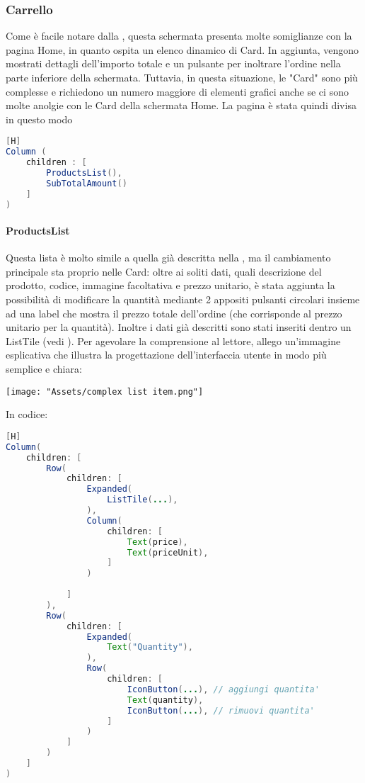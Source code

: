 \noindent
\subsubsection{Carrello}
Come è facile notare dalla , questa schermata presenta molte somiglianze con la pagina Home, in quanto ospita un elenco dinamico di Card. In aggiunta, vengono mostrati dettagli dell'importo totale e un pulsante per inoltrare l'ordine nella parte inferiore della schermata. Tuttavia, in questa situazione, le "Card" sono più complesse e richiedono un numero maggiore di elementi grafici anche se ci sono molte anolgie con le Card della schermata Home. La pagina è stata quindi divisa in questo modo
\begin{lstlisting}[language=Java, firstnumber=1][H]
Column (
	children : [
		ProductsList(),
		SubTotalAmount()
	]
)
\end{lstlisting}

\noindent
\paragraph{ProductsList}
Questa lista è molto simile a quella già descritta nella , ma il cambiamento principale sta proprio nelle Card: oltre ai soliti dati, quali descrizione del prodotto, codice, immagine facoltativa e prezzo unitario, è stata aggiunta la possibilità di modificare la quantità mediante 2 appositi pulsanti circolari insieme ad una label che mostra il prezzo totale dell'ordine (che corrisponde al prezzo unitario per la quantità). Inoltre i dati già descritti sono stati inseriti dentro un ListTile (vedi ). Per agevolare la comprensione al lettore, allego un'immagine esplicativa che illustra la progettazione dell'interfaccia utente in modo più semplice e chiara:
\begin{flushleft}
	\begin{minipage}[t]{1\linewidth}
		\texttt{[image: "Assets/complex list item.png"]}
		\label{fig:complexCard}
	\end{minipage}
\end{flushleft}

\noindent
In codice:
\begin{lstlisting}[language=Java, firstnumber=1][H]
Column(
	children: [
		Row(
			children: [
				Expanded(
					ListTile(...),
				),
				Column(
					children: [
						Text(price),
						Text(priceUnit),
					]
				)
			
			]
		),
		Row(
			children: [
				Expanded(
					Text("Quantity"),
				),
				Row(
					children: [
						IconButton(...), // aggiungi quantita'
						Text(quantity),
						IconButton(...), // rimuovi quantita'
					]
				)
			]
		)
	]
)
\end{lstlisting}

